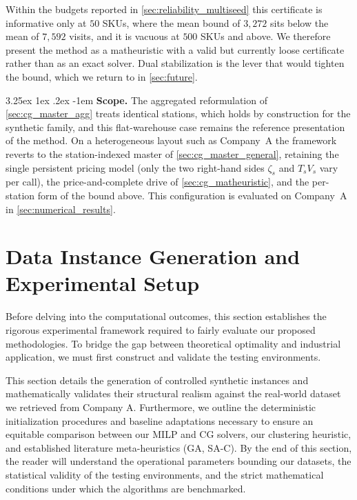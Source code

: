 \documentclass[preprint,review,11pt,authoryear]{elsarticle}
\makeatletter
\renewcommand\paragraph{\@startsection{paragraph}{4}{\z@}
  {3.25ex \@plus1ex \@minus.2ex}
  {-1em}
  {\normalfont\normalsize\itshape}}
\makeatother
\begin{document}
Within the budgets reported in \cref{sec:reliability_multiseed} this certificate is informative only at $50$ SKUs, where the mean bound of $3{,}272$ sits below the mean of $7{,}592$ visits, and it is vacuous at $500$ SKUs and above. We therefore present the method as a matheuristic with a valid but currently loose certificate rather than as an exact solver. Dual stabilization is the lever that would tighten the bound, which we return to in \cref{sec:future}.

\paragraph{\textbf{Scope.}} The aggregated reformulation of \cref{sec:cg_master_agg} treats identical stations, which holds by construction for the synthetic family, and this flat-warehouse case remains the reference presentation of the method. On a heterogeneous layout such as Company~A the framework reverts to the station-indexed master of \cref{sec:cg_master_general}, retaining the single persistent pricing model (only the two right-hand sides $\zeta_s$ and $T_s V_s$ vary per call), the price-and-complete drive of \cref{sec:cg_matheuristic}, and the per-station form of the bound above. This configuration is evaluated on Company~A in \cref{sec:numerical_results}.




\section{Data Instance Generation and Experimental Setup}
\label{sec:data_generation}

Before delving into the computational outcomes, this section establishes the rigorous experimental framework required to fairly evaluate our proposed methodologies. To bridge the gap between theoretical optimality and industrial application, we must first construct and validate the testing environments. 

This section details the generation of controlled synthetic instances and mathematically validates their structural realism against the real-world dataset we retrieved from Company A. Furthermore, we outline the deterministic initialization procedures and baseline adaptations necessary to ensure an equitable comparison between our MILP and CG solvers, our clustering heuristic, and established literature meta-heuristics (GA, SA-C). By the end of this section, the reader will understand the operational parameters bounding our datasets, the statistical validity of the testing environments, and the strict mathematical conditions under which the algorithms are benchmarked.
\end{document}
